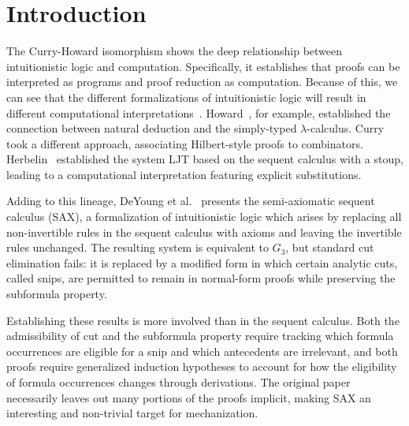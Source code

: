 \section{Introduction}

The Curry-Howard isomorphism shows the deep relationship between intuitionistic
logic and computation. Specifically, it establishes that proofs can be
interpreted as programs and proof reduction as computation. Because of this, we
can see that the different formalizations of intuitionistic logic will result in
different computational interpretations~\cite{DeYoung2020}.
Howard~\cite{Howard1980FormulaeAsTypes}, for example, established the connection
between natural deduction and the simply-typed $\lambda$-calculus.
Curry~\cite{doi:10.1073/pnas.20.11.584} took a different approach, associating
Hilbert-style proofs to combinators. Herbelin~\cite{Herbelin1995LambdaCalculusStructure}
established the system LJT based on the sequent calculus with a stoup, leading
to a computational interpretation featuring explicit substitutions.

Adding to this lineage, DeYoung et al.~\cite{DeYoung2020} presents the
semi-axiomatic sequent calculus (SAX), a formalization of intuitionistic logic
which arises by replacing all non-invertible rules in the sequent calculus with
axioms and leaving the invertible rules unchanged. The resulting system is
equivalent to $G_3$, but standard cut elimination fails: it is replaced by a
modified form in which certain analytic cuts, called snips, are permitted to
remain in normal-form proofs while preserving the subformula property.

Establishing these results is more involved than in the sequent calculus. Both
the admissibility of cut and the subformula property require tracking which
formula occurrences are eligible for a snip and which antecedents are
irrelevant, and both proofs require generalized induction hypotheses to account
for how the eligibility of formula occurrences changes through derivations. The
original paper necessarily leaves out many portions of the proofs implicit,
making SAX an interesting and non-trivial target for mechanization.

